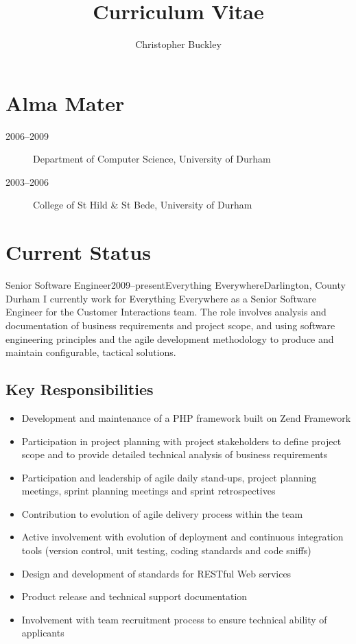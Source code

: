 \documentclass{cv}
\title{Curriculum Vitae}
\author{Christopher Buckley}
\begin{document}
\section{Alma Mater}

\begin{description}
\item[2006--2009] Department of Computer Science, University of Durham
\item[2003--2006] College of St Hild \& St Bede, University of Durham
\end{description}

\section{Current Status}

\begin{experience}{Senior Software Engineer}{2009--present}{Everything Everywhere}{Darlington, County Durham}
I currently work for Everything Everywhere as a Senior Software Engineer for the Customer Interactions team. The role involves analysis and documentation of business requirements and project scope, and using software engineering principles and the agile development methodology to produce and maintain configurable, tactical solutions.

\subsection*{Key Responsibilities}

\begin{itemize}
\item Development and maintenance of a PHP framework built on Zend Framework
\item Participation in project planning with project stakeholders to define project scope and to provide detailed technical analysis of business requirements
\item Participation and leadership of agile daily stand-ups, project planning meetings, sprint planning meetings and sprint retrospectives
\item Contribution to evolution of agile delivery process within the team
\item Active involvement with evolution of deployment and continuous integration tools (version control, unit testing, coding standards and code sniffs)
\item Design and development of standards for RESTful Web services
\item Product release and technical support documentation
\item Involvement with team recruitment process to ensure technical ability of applicants
\end{itemize}
\end{experience}
\end{document}
